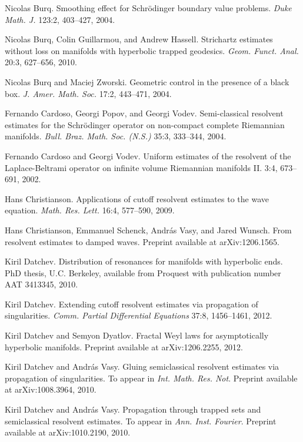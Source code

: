 \documentclass[reqno, 12pt]{amsart}
\theoremstyle{definition}
\numberwithin{equation}{section}
\numberwithin{prop}{section}
\numberwithin{figure}{section}
\begin{document}
\begin{thebibliography}{00}
 Nicolas Burq. Smoothing effect for Schr\"odinger boundary value problems.
\textit{Duke Math. J.} 123:2, 403--427, 2004.

 Nicolas Burq, Colin Guillarmou, and Andrew Hassell. Strichartz estimates without loss on manifolds with hyperbolic trapped geodesics. \textit{Geom. Funct. Anal.} 20:3, 627--656, 2010.


 Nicolas Burq and Maciej Zworski. Geometric control in the presence of a black box. \textit{J. Amer. Math. Soc.} 17:2, 443--471, 2004.

  Fernando Cardoso, Georgi Popov, and Georgi Vodev. Semi-classical resolvent estimates for the Schr\"odinger operator on non-compact complete Riemannian manifolds. \textit{Bull. Braz. Math. Soc. (N.S.)} 35:3, 333--344, 2004.

 Fernando Cardoso and Georgi Vodev.
\newblock Uniform estimates of the resolvent of the {L}aplace-{B}eltrami
  operator on infinite volume {R}iemannian manifolds {II}.
 3:4, 673--691, 2002.

 Hans Christianson. Applications of cutoff resolvent estimates to the wave equation. \textit{Math. Res. Lett.} 16:4, 577--590, 2009. 

 Hans Christianson, Emmanuel Schenck, Andr\'as Vasy, and Jared Wunsch. From resolvent estimates to damped waves. Preprint available at arXiv:1206.1565.

 Kiril Datchev. Distribution of resonances for manifolds with hyperbolic ends. PhD thesis, U.C. Berkeley, available from Proquest with publication number AAT 3413345, 2010.

 Kiril Datchev. Extending cutoff resolvent estimates via propagation of singularities. \textit{Comm. Partial Differential Equations} 37:8, 1456--1461, 2012.  

 Kiril Datchev and Semyon Dyatlov. Fractal Weyl laws for asymptotically hyperbolic manifolds. Preprint available at  arXiv:1206.2255, 2012.

 Kiril Datchev and Andr\'as Vasy. Gluing semiclassical resolvent estimates via propagation of singularities. To appear in \textit{Int. Math. Res. Not}.  Preprint available at arXiv:1008.3964, 2010.

 Kiril Datchev and Andr\'as Vasy. Propagation through trapped sets and semiclassical resolvent estimates. To appear in \textit{Ann. Inst. Fourier}. Preprint available at arXiv:1010.2190, 2010.


\end{thebibliography}
\end{document}

